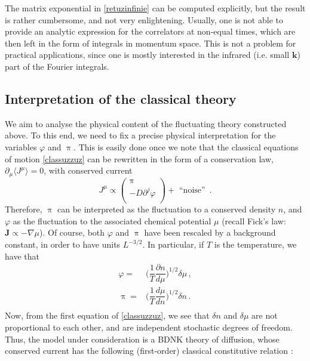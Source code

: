 \documentclass[a4paper, amsfonts, amssymb, amsmath, reprint, showkeys, nofootinbib, twoside,notitlepage,onecolumn]{revtex4-2}
\newcommand{\kb}{{\textbf{k}}}
\theoremstyle{definition}
\begin{document}
The matrix exponential in \eqref{retuzinfinie} can be computed explicitly, but the result is rather cumbersome, and not very enlightening. Usually, one is not able to provide an analytic expression for the correlators at non-equal times, which are then left in the form of integrals in momentum space. This is not a problem for practical applications, since one is mostly interested in the infrared (i.e. small $\kb$) part of the Fourier integrals.

\subsection{Interpretation of the classical theory}

We aim to analyse the physical content of the fluctuating theory constructed above. To this end, we need to fix a precise physical interpretation for the variables $\varphi$ and $\uppi$. This is easily done once we note that the classical equations of motion \eqref{classuzzuz} can be rewritten in the form of a conservation law, $\partial_\mu \langle J^\mu \rangle =0$, with conserved current
\begin{equation}\label{napoeloneee}
    J^\mu \propto
    \begin{pmatrix}
        \uppi \\
        -D \partial^j \varphi \\
    \end{pmatrix}
    +\text{ ``noise'' }\, .
\end{equation}
Therefore, $\uppi$ can be interpreted as the fluctuation to a conserved density $n$, and $\varphi$ as the fluctuation to the associated chemical potential $\mu$ (recall Fick's law: $\textbf{J} \propto -\nabla \mu$). Of course, both $\varphi$ and $\uppi$ have been rescaled by a background constant, in order to have units $L^{-3/2}$. In particular, if $T$ is the temperature, we have that
\begin{equation}
    \begin{split}
        \varphi ={}& \bigg(\dfrac{1}{T}\dfrac{\partial n}{d\mu} \bigg)^{1/2} \delta \mu \, , \\
        \uppi ={}&  \bigg(\dfrac{1}{T}\dfrac{d\mu}{dn} \bigg)^{1/2} \delta n \, . \\
    \end{split}
\end{equation}
Now, from the first equation of \eqref{classuzzuz}, we see that $\delta n$ and $\delta \mu$ are not proportional to each other, and are independent stochastic degrees of freedom. Thus, the model under consideration is a BDNK theory of diffusion, whose conserved current has the following (first-order) classical constitutive relation \cite{Kovtun2019}:
\end{document}
